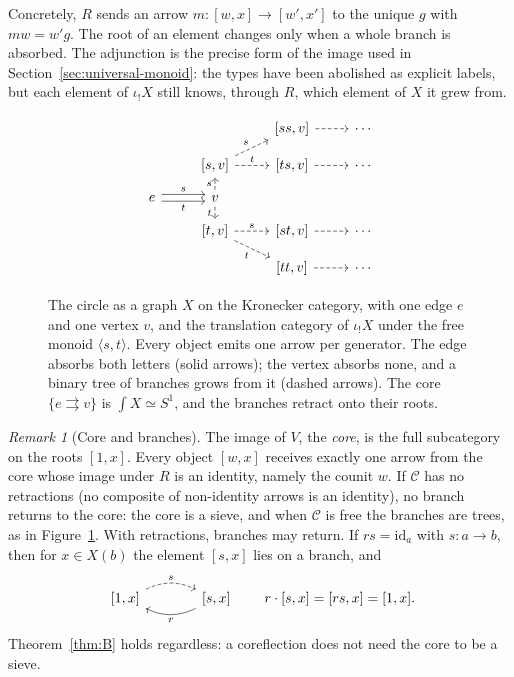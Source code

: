 \documentclass[11pt]{amsart}
\theoremstyle{definition}
\theoremstyle{remark}
\newtheorem{remark}[teo]{Remark}
\numberwithin{figure}{section}%
\newcommand{\C}{\mathcal{C}}
\begin{document}
Concretely, $R$ sends an arrow $m\colon[w,x]\to[w',x']$ to the unique $g$ with $mw=w'g$. The root of an element changes only when a whole branch is absorbed. The adjunction is the precise form of the image used in Section~\ref{sec:universal-monoid}: the types have been abolished as explicit labels, but each element of $\iota_!X$ still knows, through $R$, which element of $X$ it grew from.

\begin{figure}[ht]
\[
\begin{tikzcd}[row sep=small, column sep=normal]
 & & {[ss,v]} \arrow[r,dashed] & \cdots\\
 & {[s,v]} \arrow[ur,dashed,"s"] \arrow[r,dashed,"t"] & {[ts,v]} \arrow[r,dashed] & \cdots\\
e \arrow[r, shift left, "s"] \arrow[r, shift right, "t"'] & v \arrow[u,dashed,"s"] \arrow[d,dashed,"t"'] & & \\
 & {[t,v]} \arrow[r,dashed,"s"] \arrow[dr,dashed,"t"'] & {[st,v]} \arrow[r,dashed] & \cdots\\
 & & {[tt,v]} \arrow[r,dashed] & \cdots
\end{tikzcd}
\]
\caption{The circle as a graph $X$ on the Kronecker category, with one edge $e$ and one vertex $v$, and the translation category of $\iota_!X$ under the free monoid $\langle s,t\rangle$. Every object emits one arrow per generator. The edge absorbs both letters (solid arrows); the vertex absorbs none, and a binary tree of branches grows from it (dashed arrows). The core $\{e\rightrightarrows v\}$ is $\int X\simeq S^1$, and the branches retract onto their roots.}
\label{fig:kron}
\end{figure}

\begin{remark}[Core and branches]\label{rem:core}
The image of $V$, the \emph{core}, is the full subcategory on the roots $[1,x]$. Every object $[w,x]$ receives exactly one arrow from the core whose image under $R$ is an identity, namely the counit $w$. If $\C$ has no retractions (no composite of non-identity arrows is an identity), no branch returns to the core: the core is a sieve, and when $\C$ is free the branches are trees, as in Figure~\ref{fig:kron}. With retractions, branches may return. If $rs=\mathrm{id}_a$ with $s\colon a\to b$, then for $x\in X(b)$ the element $[s,x]$ lies on a branch, and
\[
\begin{tikzcd}[column sep=large]
{[1,x]} \arrow[r, bend left=25, dashed, "s"] & {[s,x]} \arrow[l, bend left=25, "r"]
\end{tikzcd}
\qquad r\cdot[s,x]=[rs,x]=[1,x].
\]
Theorem~\ref{thm:B} holds regardless: a coreflection does not need the core to be a sieve.
\end{remark}
\end{document}
